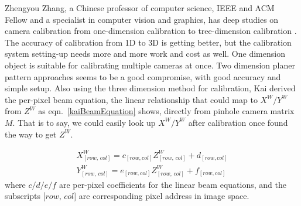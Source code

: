 
Zhengyou Zhang, a Chinese professor of computer science, IEEE and ACM Fellow and a specialist in computer vision and graphics, has deep studies on camera calibration from one-dimension calibration to tree-dimension calibration \cite{zhangCalibration1_2004} \cite{zhangCalibration2_2000} \cite{Zhengyou04}. The accuracy of calibration from 1D to 3D is getting better, but the calibration system setting-up needs more and more work and cost as well. One dimension object is suitable for calibrating multiple cameras at once. Two dimension planer pattern approaches seems to be a good compromise, with good accuracy and simple setup. Also using the three dimension method for calibration, Kai \cite{Kai10} derived the per-pixel  beam equation, the linear relationship that could map to \(X^W/Y^W\) from \(Z^W\) as eqn.~\ref{kaiBeamEquation} shows, directly from pinhole camera matrix \(M\). That is to say, we could easily look up \(X^W/Y^W\) after calibration once found the way to get \(Z^W\).

\begin{equation}
\begin{aligned}
X^W_{[row, \, col]} = c_{[row, col]}Z^W_{[row, \, col]}+d_{[row, col]}
\\%
Y^W_{[row, \, col]} = e_{[row, col]}Z^W_{[row, \, col]}+f_{[row, col]}
\end{aligned}
\label{kaiBeamEquation}
\end{equation}%
\noindent
where \(c/d/e/f\) are per-pixel coefficients for the linear beam equations, and the subscripts [\(row, \, col\)] are corresponding pixel address in image space.



